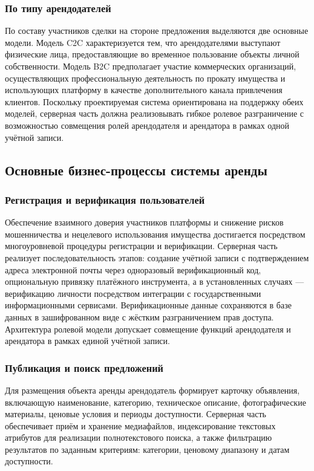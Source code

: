 \subsubsection{По типу арендодателей}
 
По составу участников сделки на стороне предложения выделяются две основные модели. Модель C2C характеризуется тем, что арендодателями выступают физические лица, предоставляющие во временное пользование объекты личной собственности. Модель B2C предполагает участие коммерческих организаций, осуществляющих профессиональную деятельность по прокату имущества и использующих платформу в качестве дополнительного канала привлечения клиентов. Поскольку проектируемая система ориентирована на поддержку обеих моделей, серверная часть должна реализовывать гибкое ролевое разграничение с возможностью совмещения ролей арендодателя и арендатора в рамках одной учётной записи.
 
\subsection{Основные бизнес-процессы системы аренды}
 
\subsubsection{Регистрация и верификация пользователей}
 
Обеспечение взаимного доверия участников платформы и снижение рисков мошенничества и нецелевого использования имущества достигается посредством многоуровневой процедуры регистрации и верификации. Серверная часть реализует последовательность этапов: создание учётной записи с подтверждением адреса электронной почты через одноразовый верификационный код, опциональную привязку платёжного инструмента, а в установленных случаях — верификацию личности посредством интеграции с государственными информационными сервисами. Верификационные данные сохраняются в базе данных в зашифрованном виде с жёстким разграничением прав доступа. Архитектура ролевой модели допускает совмещение функций арендодателя и арендатора в рамках единой учётной записи.
 
\subsubsection{Публикация и поиск предложений}
 
Для размещения объекта аренды арендодатель формирует карточку объявления, включающую наименование, категорию, техническое описание, фотографические материалы, ценовые условия и периоды доступности. Серверная часть обеспечивает приём и хранение медиафайлов, индексирование текстовых атрибутов для реализации полнотекстового поиска, а также фильтрацию результатов по заданным критериям: категории, ценовому диапазону и датам доступности.
 
